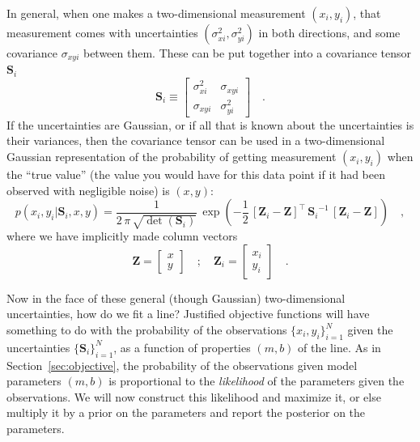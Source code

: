 \documentclass[12pt,twoside]{article}
\newcommand{\sectionname}{Section}
\newcommand{\mmatrix}[1]{\boldsymbol{#1}}
\newcommand{\inverse}[1]{{#1}^{-1}}
\newcommand{\transpose}[1]{{#1}^{\scriptscriptstyle \top}}
\newcommand{\mS}{\mmatrix{S}}
\newcommand{\mZ}{\mmatrix{Z}}
\newcommand{\setofall}[3]{\{{#1}\}_{{#2}}^{{#3}}}
\newcommand{\allxy}{\setofall{x_i,y_i}{i=1}{N}}
\newcommand{\allS}{\setofall{\mS_i}{i=1}{N}}
\begin{document}
In general, when one makes a two-dimensional measurement $(x_i,y_i)$,
that measurement comes with uncertainties $(\sigma_{xi}^2,\sigma_{yi}^2)$
in both directions, and some covariance $\sigma_{xyi}$ between them.
These can be put together into a covariance tensor $\mS_i$
\begin{equation}
\mS_i \equiv \left[\begin{array}{cc}
\sigma_{xi}^2 & \sigma_{xyi} \\ \sigma_{xyi} & \sigma_{yi}^2
\end{array}\right] \quad .
\end{equation}
If the uncertainties are Gaussian, or if all that is known about the
uncertainties is their variances, then the covariance tensor can be
used in a two-dimensional Gaussian representation of the probability
of getting measurement $(x_i,y_i)$ when the ``true value'' (the value
you would have for this data point if it had been observed with
negligible noise) is $(x,y)$:
\begin{equation}
p(x_i,y_i|\mS_i,x,y) = \frac{1}{2\,\pi\,\sqrt{\det(\mS_i)}}
  \,\exp\left(-\frac{1}{2}\,\transpose{\left[\mZ_i - \mZ\right]}
  \,\inverse{\mS_i}\,\left[\mZ_i - \mZ\right]\right) \quad ,
\end{equation}
where we have implicitly made column vectors
\begin{equation}\label{eq:mZ}
\mZ = \left[\begin{array}{c} x \\ y \end{array}\right] \quad ; \quad
\mZ_i = \left[\begin{array}{c} x_i \\ y_i \end{array}\right] \quad .
\end{equation}

Now in the face of these general (though Gaussian) two-dimensional
uncertainties, how do we fit a line?  Justified objective functions
will have something to do with the probability of the observations
$\allxy$ given the uncertainties $\allS$, as a function of properties
$(m,b)$ of the line.  As in \sectionname~\ref{sec:objective}, the
probability of the observations given model parameters $(m,b)$ is
proportional to the \emph{likelihood} of the parameters given the
observations.  We will now construct this likelihood and maximize it,
or else multiply it by a prior on the parameters and report the
posterior on the parameters.
\end{document}
